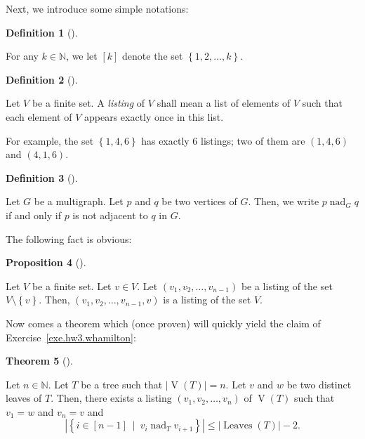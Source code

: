 \documentclass[numbers=enddot,12pt,final,onecolumn,notitlepage]{scrartcl}%
\theoremstyle{definition}
\newtheorem{theo}{Theorem}[section]
\newenvironment{theorem}[1][]
{\begin{theo}[#1]\begin{leftbar}}
{\end{leftbar}\end{theo}}
\newtheorem{prop}[theo]{Proposition}
\newenvironment{proposition}[1][]
{\begin{prop}[#1]\begin{leftbar}}
{\end{leftbar}\end{prop}}
\newtheorem{defi}[theo]{Definition}
\newenvironment{definition}[1][]
{\begin{defi}[#1]\begin{leftbar}}
{\end{leftbar}\end{defi}}
\newcommand{\NN}{\mathbb{N}}
\newcommand{\set}[1]{\left\{ #1 \right\}}
\newcommand{\abs}[1]{\left| #1 \right|}
\newcommand{\tup}[1]{\left( #1 \right)}
\newcommand{\ive}[1]{\left[ #1 \right]}
\newcommand{\verts}[1]{\operatorname{V}\left( #1 \right)}
\newcommand{\leaves}[1]{\operatorname{Leaves}\left( #1 \right)}
\begin{document}
Next, we introduce some simple notations:

\begin{definition}
For any $k \in \NN$, we let $\ive{k}$ denote the set
$\set{1, 2, \ldots, k}$.
\end{definition}

\begin{definition}
Let $V$ be a finite set.
A \textit{listing} of $V$ shall mean a list of elements of $V$
such that each element of $V$ appears exactly once in this list.

For example, the set $\set{1, 4, 6}$ has exactly $6$ listings;
two of them are $\tup{1, 4, 6}$ and $\tup{4, 1, 6}$.
\end{definition}

\begin{definition}
Let $G$ be a multigraph.
Let $p$ and $q$ be two vertices of $G$.
Then, we write $p \operatorname{nad}_G q$ if and only if
$p$ is not adjacent to $q$ in $G$.
\end{definition}

The following fact is obvious:

\begin{proposition}
\label{prop.hw3.listing.add-vertex}
Let $V$ be a finite set.
Let $v \in V$.
Let $\tup{v_1, v_2, \ldots, v_{n-1}}$ be a listing of the set
$V \setminus \set{v}$.
Then, $\tup{v_1, v_2, \ldots, v_{n-1}, v}$ is a listing of the
set $V$.
\end{proposition}

Now comes a theorem which (once proven) will quickly yield the claim
of Exercise~\ref{exe.hw3.whamilton}:

\begin{theorem} \label{thm.hw3.uv-pc}
Let $n \in \NN$.
Let $T$ be a tree such that $\abs{\verts{T}} = n$.
Let $v$ and $w$ be two distinct leaves of $T$.
Then, there exists a listing $\tup{v_1, v_2, \ldots, v_n}$ of
$\verts{T}$ such that $v_1 = w$ and $v_n = v$ and
\[
\abs{\set{i \in \ive{n-1} \ \mid \ v_i \operatorname{nad}_T v_{i+1} }}
\leq \abs{\leaves{T}} - 2.
\]
\end{theorem}
\end{document}
